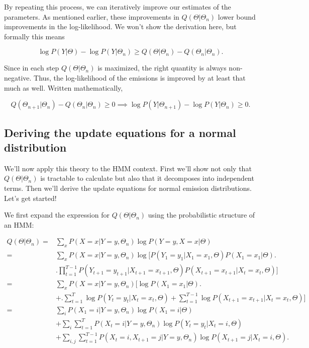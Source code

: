 By repeating this process, we can iteratively improve our estimates of the parameters. As mentioned earlier, these improvements in $Q(\Theta|\Theta_n)$ lower bound improvements in the log-likelihood. We won't show the derivation here, but formally this means

\begin{equation*}
\log P(Y|\Theta) - \log P(Y|\Theta_n) \ge Q(\Theta|\Theta_n) - Q(\Theta_n|\Theta_n).
\end{equation*}

Since in each step $Q(\Theta|\Theta_n)$ is maximized, the right quantity is always non-negative. Thus, the log-likelihood of the emissions is improved by at least that much as well. Written mathematically,

\begin{equation*}
Q(\Theta_{n+1}|\Theta_n) - Q(\Theta_n|\Theta_n) \ge 0
\implies
\log P(Y|\Theta_{n+1}) - \log P(Y|\Theta_n) \ge 0.
\end{equation*}

\subsection{Deriving the update equations for a normal distribution}

We'll now apply this theory to the HMM context. First we'll show not only that $Q(\Theta|\Theta_n)$ is tractable to calculate but also that it decomposes into independent terms. Then we'll derive the update equations for normal emission distributions. Let's get started!

We first expand the expression for $Q(\Theta|\Theta_n)$ using the probabilistic structure of an HMM:

\begin{align*}
Q(\Theta|\Theta_n)
=& \sum_x P(X=x|Y=y, \Theta_n) \log P(Y=y, X=x|\Theta) \\
=& \sum_x P(X=x|Y=y, \Theta_n)
          \log \biggl[P(Y_1=y_1|X_1=x_1, \Theta)P(X_1=x_1|\Theta) \biggr. \\
                     & \biggl. \prod_{t=1}^{T-1} P(Y_{t+1}=y_{t+1}|X_{t+1}=x_{t+1}, \Theta) P(X_{t+1}=x_{t+1}|X_t=x_t, \Theta)
               \biggr] \\
=& \sum_x P(X=x|Y=y, \Theta_n)
          \biggl[\log P(X_1=x_1|\Theta) \biggr. \\
                & + \biggl. \sum_{t=1}^T \log P(Y_t=y_t|X_t=x_t, \Theta)
                + \sum_{t=1}^{T-1} \log P(X_{t+1}=x_{t+1}|X_t=x_t, \Theta)
          \biggr] \\
=& \sum_i P(X_1=i|Y=y, \Theta_n) \log P(X_1=i|\Theta) \\
 & + \sum_i \sum_{t=1}^T P(X_t=i|Y=y, \Theta_n) \log P(Y_t=y_t|X_t=i, \Theta) \\
 & + \sum_{i, j} \sum_{t=1}^{T-1} P(X_t=i, X_{t+1}=j|Y=y, \Theta_n) \log P(X_{t+1}=j|X_t=i, \Theta). \\
\end{align*}

